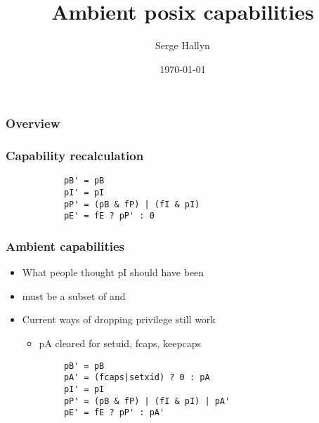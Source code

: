 \documentclass{beamer}
\title[Ambient capabilities]{Ambient posix capabilities} %
\author{Serge Hallyn} %
\institute[Canonical] %
{
Canonical, Ltd \\ %
\medskip
\textit{serge.hallyn@ubuntu.com} %
}
\date{\today} %
\begin{document}
\begin{frame}
\titlepage %
\end{frame}

\begin{frame}
\frametitle{Overview} %
\tableofcontents %
\end{frame}

\begin{frame}[fragile]
\frametitle{Capability recalculation}
\begin{figure}
\centering
\begin{verbatim}
      pB' = pB
      pI' = pI
      pP' = (pB & fP) | (fI & pI)
      pE' = fE ? pP' : 0
\end{verbatim}
\end{figure}
\end{frame}

\begin{frame}[fragile]
\frametitle{Ambient capabilities}
  \begin{itemize}
  \item What people thought pI should have been
  \item \verb@pA@ must be a subset of \verb@pI@ and \verb@pP@
  \item Current ways of dropping privilege still work
    \begin{itemize}
    \item pA cleared for setuid, fcaps, keepcaps
    \end{itemize}
  \end{itemize}
\pause
\vspace{.3in}

\begin{figure}
\centering
\begin{verbatim}
      pB' = pB
      pA' = (fcaps|setxid) ? 0 : pA
      pI' = pI
      pP' = (pB & fP) | (fI & pI) | pA'
      pE' = fE ? pP' : pA'
\end{verbatim}
\end{figure}
\end{frame}
\end{document}
